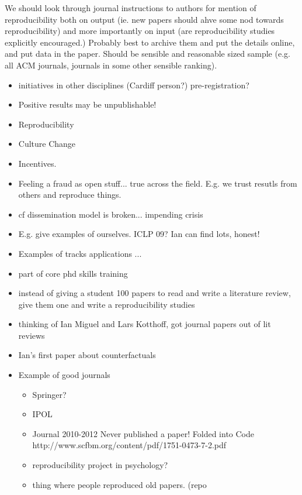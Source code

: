 \documentclass[a4paper,11pt]{article}
\begin{document}
We should look through journal instructions to authors for mention of
reproducibility both on output (ie. new papers should ahve some nod
towards reproducibility) and more importantly on input (are
reproducibility studies explicitly encouraged.)  Probably best to
archive them and put the details online, and put data in the
paper. Should be sensible and reasonable sized sample (e.g. all ACM
journals, journals in some other sensible ranking).

\begin{itemize}


\item initiatives in other disciplines (Cardiff person?) pre-registration?
\item Positive results may be unpublishable!   

\item Reproducibility

\item Culture Change 
\item Incentives.  

\item Feeling a fraud as open stuff... true across the field.  E.g. we trust resutls from others and reproduce things.

\item cf dissemination model is broken... impending crisis

\item E.g. give examples of ourselves.   ICLP 09?  Ian can find lots, honest!

\item Examples of tracks applications ... 

\item part of core phd skills training
\item instead of giving a student 100 papers to read and write a literature review, give them one and write a reproducibility studies
\item thinking of Ian Miguel and Lars Kotthoff, got journal papers out of lit reviews
\item Ian's first paper about counterfactuals





\item Example of good journals
\begin{itemize}
\item Springer?
\item IPOL
\item
Journal 2010-2012
Never published a paper!
Folded into Code 
http://www.scfbm.org/content/pdf/1751-0473-7-2.pdf

\item reproducibility project in psychology?

\item thing where people reproduced old papers.  (repo 

\end{itemize}



\end{itemize}
\end{document}
